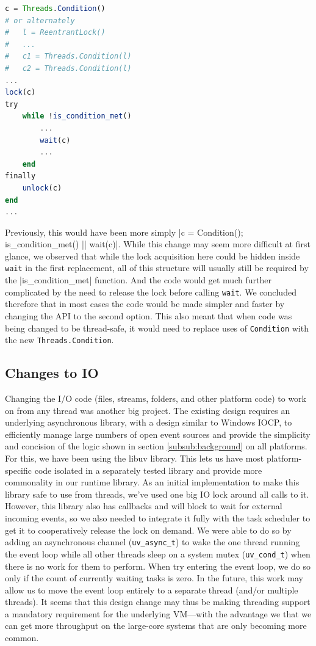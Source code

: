 \documentclass{juliacon}
\begin{document}
\begin{lstlisting}[language = Julia]
c = Threads.Condition()
# or alternately
#   l = ReentrantLock()
#   ...
#   c1 = Threads.Condition(l)
#   c2 = Threads.Condition(l)
...
lock(c)
try
    while !is_condition_met()
        ...
        wait(c)
        ...
    end
finally
    unlock(c)
end
...
\end{lstlisting}

Previously, this would have been more simply |c = Condition(); is_condition_met() || wait(c)|.  While this change may seem more difficult at first glance, we observed that while the lock acquisition here could be hidden inside \verb|wait| in the first replacement, all of this structure will usually still be required by the |is_condition_met| function. And the code would get much further complicated by the need to release the lock before calling \verb|wait|. We concluded therefore that in most cases the code would be made simpler and faster by changing the API to the second option. This also meant that when code was being changed to be thread-safe, it would need to replace uses of \verb|Condition| with the new \verb|Threads.Condition|.

\subsection{Changes to IO}
\label{subsub:integration-io}

Changing the I/O code (files, streams, folders, and other platform code) to work on from any thread was another big project. The existing design requires an underlying asynchronous library, with a design similar to Windows IOCP, to efficiently manage large numbers of open event sources and provide the simplicity and concision of the logic shown in section \ref{subsub:background} on all platforms. For this, we have been using the libuv library. This lets us have most platform-specific code isolated in a separately tested library and provide more commonality in our runtime library. As an initial implementation to make this library safe to use from threads, we've used one big IO lock around all calls to it. However, this library also has callbacks and will block to wait for external incoming events, so we also needed to integrate it fully with the task scheduler to get it to cooperatively release the lock on demand. We were able to do so by adding an asynchronous channel (\verb|uv_async_t|) to wake the one thread running the event loop while all other threads sleep on a system mutex (\verb|uv_cond_t|) when there is no work for them to perform. When try entering the event loop, we do so only if the count of currently waiting tasks is zero. In the future, this work may allow us to move the event loop entirely to a separate thread (and/or multiple threads). It seems that this design change may thus be making threading support a mandatory requirement for the underlying VM—with the advantage we that we can get more throughput on the large-core systems that are only becoming more common.
\end{document}
